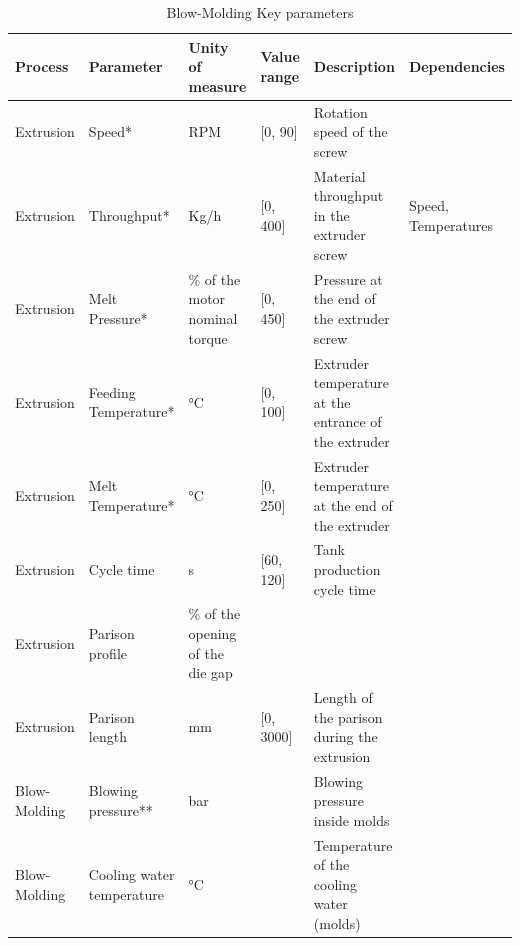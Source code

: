 \begin{landscape}
\begin{table}[]
\caption{Blow-Molding Key parameters}
\label{tab:key_parameters}
\begin{tabular}{|l|l|l|l|l|l|}
\hline
\textbf{Process}      &  \textbf{Parameter}                    & \textbf{Unity of measure}                  & \textbf{Value range}   & \textbf{Description}                                    & \textbf{Dependencies} \\ \hline
Extrusion    & Speed*                       & RPM                               & [0, 90]       & Rotation speed of the screw                               &              \\ \hline
Extrusion    & Throughput*                  & Kg/h                              & [0, 400]      & Material throughput in the extruder screw                 &  Speed, Temperatures            \\ \hline
Extrusion    & Melt Pressure*               & \% of the motor nominal torque    & [0, 450]      & Pressure at the end of the extruder screw                 &              \\ \hline
Extrusion    & Feeding Temperature*         & °C                                & [0, 100]      & Extruder temperature at the entrance of the extruder      &              \\ \hline
Extrusion    & Melt Temperature*            & °C                                & [0, 250]      & Extruder temperature at the end of the extruder          &              \\ \hline
Extrusion    & Cycle time                   & s                                 & [60, 120]     & Tank production cycle time                                &              \\ \hline
Extrusion    & Parison profile              & \% of the opening of the die gap  &               &                                                &              \\ \hline
Extrusion    & Parison length               & mm                                & [0, 3000]     & Length of the parison during the extrusion     &       \\ \hline
Blow-Molding & Blowing pressure**           & bar                               &               & Blowing pressure inside molds                                               &              \\ \hline
Blow-Molding & Cooling water temperature    & °C                                &               & Temperature of the cooling water (molds)                                               &               \\ \hline

\end{tabular}
\end{table}
\end{landscape}

